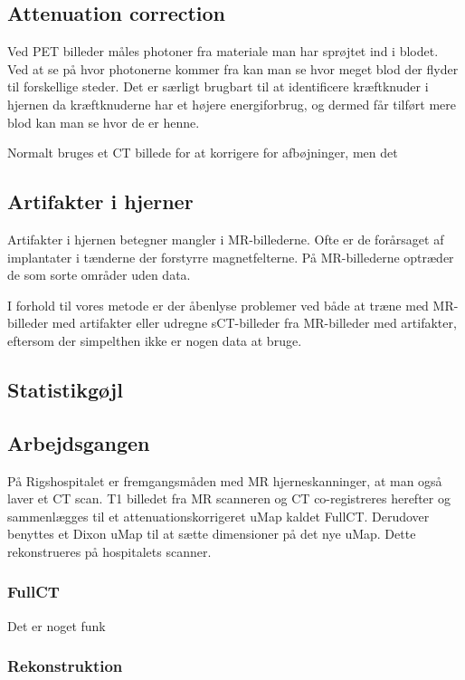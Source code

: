 \subsection{Attenuation correction}
Ved PET billeder måles photoner fra materiale man har sprøjtet ind i blodet. Ved
at se på hvor photonerne kommer fra kan man se hvor meget blod der flyder til
forskellige steder. Det er særligt brugbart til at identificere kræftknuder i
hjernen da kræftknuderne har et højere energiforbrug, og dermed får tilført
mere blod kan man se hvor de er henne.

Normalt bruges et CT billede for at korrigere for afbøjninger, men det  


\subsection{Artifakter i hjerner}
Artifakter i hjernen betegner mangler i MR-billederne. Ofte er de forårsaget
af implantater i tænderne der forstyrre magnetfelterne. På MR-billederne optræder
de som sorte områder uden data.

I forhold til vores metode er der åbenlyse problemer ved både at træne med MR-billeder
med artifakter eller udregne sCT-billeder fra MR-billeder med artifakter, eftersom der
simpelthen ikke er nogen data at bruge.


\subsection{Statistikgøjl}



\subsection{Arbejdsgangen}


På Rigshospitalet er fremgangsmåden med MR
hjerneskanninger, at man også laver et CT scan. T1 billedet fra MR scanneren
og CT co-registreres herefter og sammenlægges til et attenuationskorrigeret
uMap kaldet FullCT. Derudover benyttes et Dixon uMap til at sætte dimensioner
på det nye uMap. Dette rekonstrueres på hospitalets scanner.


\subsubsection{FullCT}


Det er noget funk

\subsubsection{Rekonstruktion}

